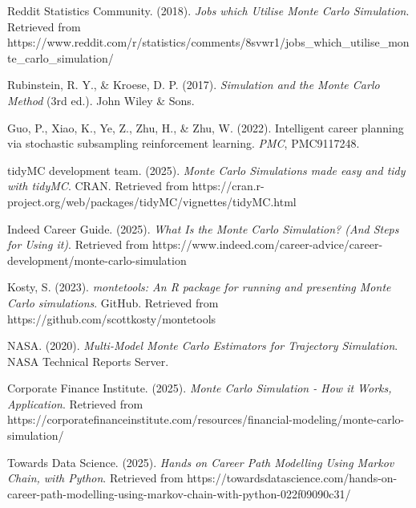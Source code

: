 \documentclass[main.tex]{subfiles}
\begin{document}
\begin{thebibliography}{20}
Reddit Statistics Community. (2018). \textit{Jobs which Utilise Monte Carlo Simulation}. Retrieved from https://www.reddit.com/r/statistics/comments/8svwr1/jobs\_which\_utilise\_monte\_carlo\_simulation/

Rubinstein, R. Y., \& Kroese, D. P. (2017). \textit{Simulation and the Monte Carlo Method} (3rd ed.). John Wiley \& Sons.

Guo, P., Xiao, K., Ye, Z., Zhu, H., \& Zhu, W. (2022). Intelligent career planning via stochastic subsampling reinforcement learning. \textit{PMC}, PMC9117248.

tidyMC development team. (2025). \textit{Monte Carlo Simulations made easy and tidy with tidyMC}. CRAN. Retrieved from https://cran.r-project.org/web/packages/tidyMC/vignettes/tidyMC.html

Indeed Career Guide. (2025). \textit{What Is the Monte Carlo Simulation? (And Steps for Using it)}. Retrieved from https://www.indeed.com/career-advice/career-development/monte-carlo-simulation

Kosty, S. (2023). \textit{montetools: An R package for running and presenting Monte Carlo simulations}. GitHub. Retrieved from https://github.com/scottkosty/montetools

NASA. (2020). \textit{Multi-Model Monte Carlo Estimators for Trajectory Simulation}. NASA Technical Reports Server.

Corporate Finance Institute. (2025). \textit{Monte Carlo Simulation - How it Works, Application}. Retrieved from https://corporatefinanceinstitute.com/resources/financial-modeling/monte-carlo-simulation/

Towards Data Science. (2025). \textit{Hands on Career Path Modelling Using Markov Chain, with Python}. Retrieved from https://towardsdatascience.com/hands-on-career-path-modelling-using-markov-chain-with-python-022f09090c31/

\end{thebibliography}
\end{document}
